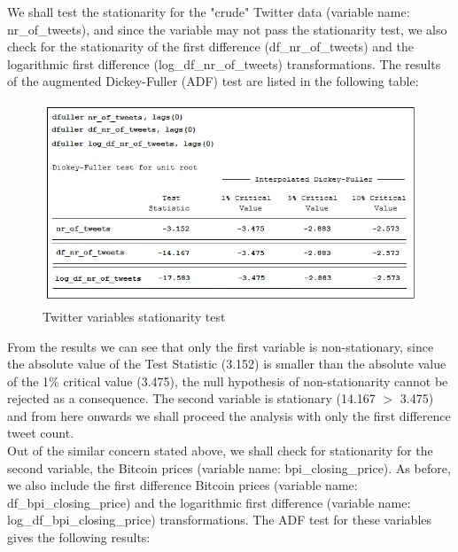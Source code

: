 \documentclass[a4paper,american,12pt]{article}
\begin{document}
\begin{spacing}{1.2}
We shall test the stationarity for the "crude" Twitter data (variable name: nr\_of\_tweets), and since the variable may not pass the stationarity test, we also check for the stationarity of the first difference (df\_nr\_of\_tweets) and the logarithmic first difference (log\_df\_nr\_of\_tweets) transformations. The results of the augmented Dickey-Fuller (ADF) test are listed in the following table:\\

\begin{figure}[H]
\centering
\includegraphics[scale=0.85]{stata_export_graphs/ADF_twitter_variables.png}
\caption{Twitter variables stationarity test}
\label{fig:3}
\end{figure}
	
From the results we can see that only the first variable is non-stationary, since the absolute value of the Test Statistic (3.152) is smaller than the absolute value of the 1\% critical value (3.475), the null hypothesis of non-stationarity cannot be rejected as a consequence. The second variable is stationary (14.167 $>$ 3.475) and from here onwards we shall proceed the analysis with only the first difference tweet count.\\

Out of the similar concern stated above, we shall check for stationarity for the second variable, the Bitcoin prices (variable name: bpi\_closing\_price). As before, we also include the first difference Bitcoin prices (variable name: df\_bpi\_closing\_price) and the logarithmic first difference (variable name: log\_df\_bpi\_closing\_price) transformations. The ADF test for these variables gives the following results:\\


\end{spacing}
\end{document}
